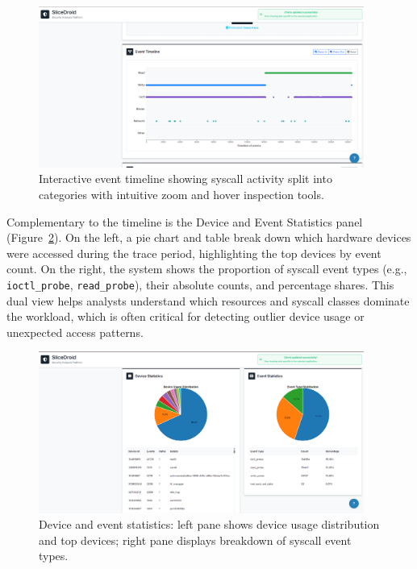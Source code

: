 \documentclass[a4paper,12pt]{report}
\begin{document}
\begin{figure}[H]
\centering
\includegraphics[width=0.95\textwidth]{system_events_timeline.png}
\caption{Interactive event timeline showing syscall activity split into categories with intuitive zoom and hover inspection tools.}
\label{fig:event_timeline}
\end{figure}

Complementary to the timeline is the Device and Event Statistics panel (Figure~\ref{fig:device_event_statistics}). On the left, a pie chart and table break down which hardware devices were accessed during the trace period, highlighting the top devices by event count. On the right, the system shows the proportion of syscall event types (e.g., \texttt{ioctl\_probe}, \texttt{read\_probe}), their absolute counts, and percentage shares. This dual view helps analysts understand which resources and syscall classes dominate the workload, which is often critical for detecting outlier device usage or unexpected access patterns.

\begin{figure}[H]
\centering
\includegraphics[width=0.95\textwidth]{device_event_statistics.png}
\caption{Device and event statistics: left pane shows device usage distribution and top devices; right pane displays breakdown of syscall event types.}
\label{fig:device_event_statistics}
\end{figure}
\end{document}
